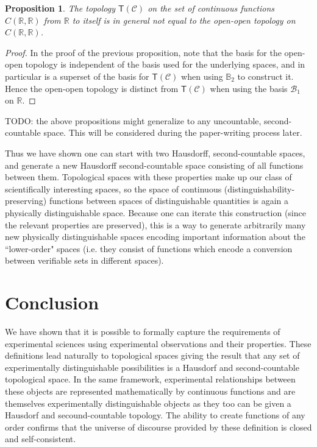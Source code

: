 \documentclass[review]{elsarticle}
\theoremstyle{plain}%
\newtheorem{prop}[thm]{Proposition}
\theoremstyle{definition}
\theoremstyle{remark}
\begin{document}
\begin{prop}
The topology $\mathsf{T}(\mathcal{C})$ on the set of continuous functions $C(\mathbb{R},\mathbb{R})$ from $\mathbb{R}$ to itself is in general not equal to the open-open topology on $C(\mathbb{R},\mathbb{R})$.
\end{prop}
\begin{proof}
In the proof of the previous proposition, note that the basis for the open-open topology is independent of the basis used for the underlying spaces, and in particular is a superset of the basis for $\mathsf{T}(\mathcal{C})$ when using $\mathbb{B}_2$ to construct it. Hence the open-open topology is distinct from $\mathsf{T}(\mathcal{C})$ when using the basis $\mathcal{B}_1$ on $\mathbb{R}$. 
\end{proof}

TODO: the above propositions might generalize to any uncountable, second-countable space. This will be considered during the paper-writing process later. 

Thus we have shown one can start with two Hausdorff, second-countable spaces, and generate a new Hausdorff second-countable space consisting of all functions between them. Topological spaces with these properties make up our class of scientifically interesting spaces, so the space of continuous (distinguishability-preserving) functions between spaces of distinguishable quantities is again a physically distinguishable space. Because one can iterate this construction (since the relevant properties are preserved), this is a way to generate arbitrarily many new physically distinguishable spaces encoding important information about the ``lower-order" spaces (i.e. they consist of functions which encode a conversion between verifiable sets in different spaces).


\section{Conclusion}

We have shown that it is possible to formally capture the requirements of experimental sciences using experimental observations and their properties. These definitions lead naturally to topological spaces giving the result that any set of experimentally distinguishable possibilities is a Hausdorf and second-countable topological space. In the same framework, experimental relationships between these objects are represented mathematically by continuous functions and are themselves experimentally distinguishable objects as they too can be given a Hausdorf and secound-countable topology. The ability to create functions of any order confirms that the universe of discourse provided by these definition is closed and self-consistent.
\end{document}
